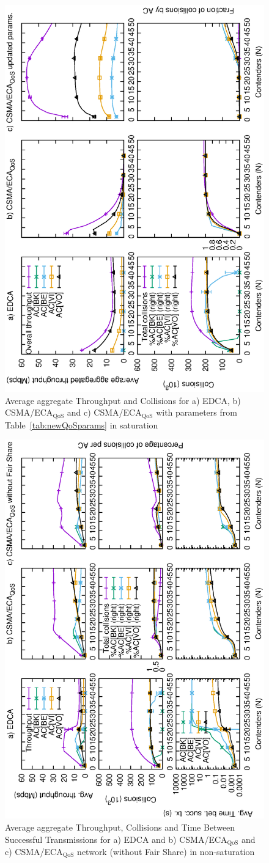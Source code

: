 \begin{figure}[tb]
	\centering
		\includegraphics[width=0.55\linewidth,angle = -90]{figures/multiplot-sat-perfect.eps}
		\caption{Average aggregate Throughput and Collisions for a) EDCA, b) CSMA/ECA$_{\text{QoS}}$ and c) CSMA/ECA$_{\text{QoS}}$ with parameters from Table~\ref{tab:newQoSparams} in saturation}
		\label{fig:multiplotSat}
\end{figure}

\begin{figure}[tb]
	\centering
		\includegraphics[width=0.55\linewidth,angle = -90]{figures/multiplot-unsat-error-0-1.eps}
		\caption{Average aggregate Throughput, Collisions and Time Between Successful Transmissions for a) EDCA and b) CSMA/ECA$_{\text{QoS}}$ and c) CSMA/ECA$_{\text{QoS}}$ network (without Fair Share) in non-saturation}
		\label{fig:multiplotUnsat}
\end{figure}
	
